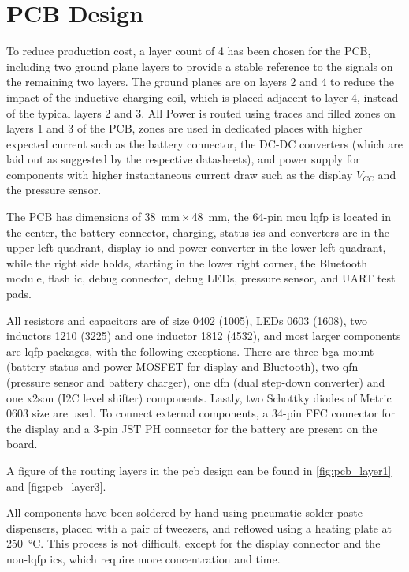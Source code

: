 \section{PCB Design}\label{section:pcb}
To reduce production cost, a layer count of 4 has been chosen for the PCB, including two ground plane layers to provide a stable reference to the signals on the remaining two layers. The ground planes are on layers 2 and 4 to reduce the impact of the inductive charging coil, which is placed adjacent to layer 4, instead of the typical layers 2 and 3. All Power is routed using traces and filled zones on layers 1 and 3 of the PCB, zones are used in dedicated places with higher expected current such as the battery connector, the DC-DC converters (which are laid out as suggested by the respective datasheets), and power supply for components with higher instantaneous current draw such as the display $V_{CC}$ and the pressure sensor.

The PCB has dimensions of \SI{38}{\milli\meter}\,$\times$\,\SI{48}{\milli\meter}, the 64-pin \gls{mcu} \gls{lqfp} is located in the center, the battery connector, charging, status \gls{ic}s and converters are in the upper left quadrant, display \gls{io} and power converter in the lower left quadrant, while the right side holds, starting in the lower right corner, the Bluetooth module, flash \gls{ic}, debug connector, debug LEDs, pressure sensor, and UART test pads.

All resistors and capacitors are of size 0402 (1005), LEDs 0603 (1608), two inductors 1210 (3225) and one inductor 1812 (4532), and most larger components are \gls{lqfp} packages, with the following exceptions. There are three \gls{bga}-mount (battery status and power MOSFET for display and Bluetooth), two \gls{qfn} (pressure sensor and battery charger), one \gls{dfn} (dual step-down converter) and one \gls{x2son} (I2C level shifter) components. Lastly, two Schottky diodes of Metric 0603 size are used. To connect external components, a 34-pin FFC connector for the display and a 3-pin JST PH connector for the battery are present on the board.

A figure of the routing layers in the \gls{pcb} design can be found in \ref{fig:pcb_layer1} and \ref{fig:pcb_layer3}.

All components have been soldered by hand using pneumatic solder paste dispensers, placed with a pair of tweezers, and reflowed using a heating plate at \SI{250}{\celsius}. This process is not difficult, except for the display connector and the non-\gls{lqfp} \gls{ic}s, which require more concentration and time.

